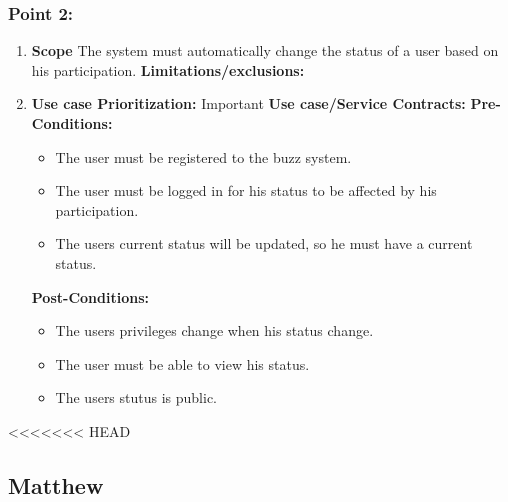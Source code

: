 \documentclass[11pt]{article}
\begin{document}
\subsubsection{Point 2:}
\begin{enumerate}
\item 
\textbf{Scope}
The system must automatically change the status of a user based on his participation.
\newline
\textbf{Limitations/exclusions:}
\item
\textbf{Use case Prioritization:} Important
\textbf{Use case/Service Contracts:} 
\newline
\textbf{Pre-Conditions: }
\begin{itemize}
\item The user must be registered to the buzz system.
\item The user must be logged in for his status to be affected by his participation.
\item The users current status will be updated, so he must have a current status.
\end{itemize}
 \textbf{Post-Conditions: }
\begin{itemize}
\item The users privileges change when his status change.
\item The user must be able to view his status.
\item The users stutus is public.
\end{itemize}
\end{enumerate}


<<<<<<< HEAD
\subsection{Matthew}
\end{document}
